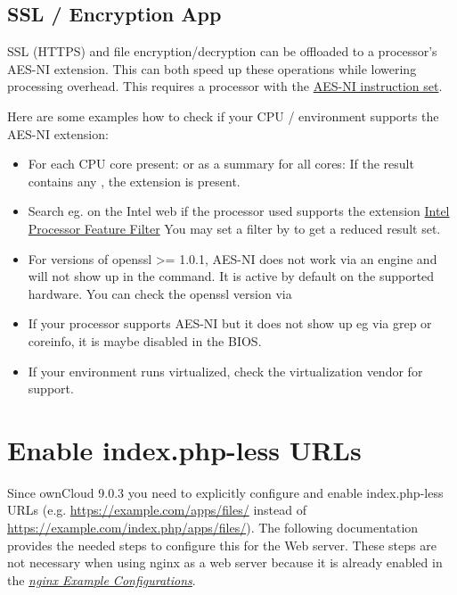 \documentclass[letterpaper,10pt,english]{sphinxmanual}
\begin{document}
\subsection{SSL / Encryption App}
\label{configuration_server/oc_server_tuning:ssl-encryption-app}
SSL (HTTPS) and file encryption/decryption can be offloaded to a processor's
AES-NI extension. This can both speed up these operations while lowering
processing overhead. This requires a processor with the \href{http://wikipedia.org/wiki/AES\_instruction\_set}{AES-NI instruction set}.

Here are some examples how to check if your CPU / environment supports the
AES-NI extension:
\begin{itemize}
\item {} 
For each CPU core present:  or as a summary for
all cores:  If the result contains any
, the extension is present.

\item {} 
Search eg. on the Intel web if the processor used supports the extension
\href{http://ark.intel.com/MySearch.aspx?AESTech=true}{Intel Processor Feature Filter} You may set a filter by
 to get a reduced result set.

\item {} 
For versions of openssl \textgreater{}= 1.0.1, AES-NI does not work via an engine and
will not show up in the  command. It is active by default
on the supported hardware. You can check the openssl version via 

\item {} 
If your processor supports AES-NI but it does not show up eg via grep or
coreinfo, it is maybe disabled in the BIOS.

\item {} 
If your environment runs virtualized, check the virtualization vendor for
support.

\end{itemize}


\section{Enable index.php-less URLs}
\label{configuration_server/index_php_less_urls::doc}\label{configuration_server/index_php_less_urls:enable-index-php-less-urls}
Since ownCloud 9.0.3 you need to explicitly configure and enable index.php-less URLs
(e.g. \href{https://example.com/apps/files/}{https://example.com/apps/files/} instead of \href{https://example.com/index.php/apps/files/}{https://example.com/index.php/apps/files/}).
The following documentation provides the needed steps to configure this for the 
Web server. These steps are not necessary when using nginx as a web server because it is already
enabled in the {\hyperref[installation/nginx_examples::doc]{\emph{nginx Example Configurations}}}.
\end{document}
